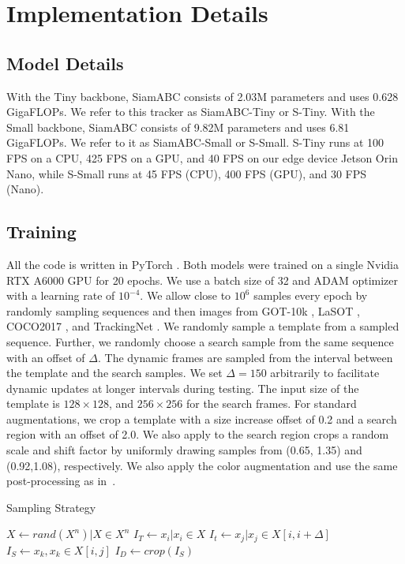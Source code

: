   \label{sec:implementation}
  
  \section{Implementation Details}
  \subsection{Model Details}
  With the Tiny backbone, SiamABC consists of 2.03M parameters and uses 0.628 GigaFLOPs. We refer to this tracker as SiamABC-Tiny or S-Tiny. With the Small backbone, SiamABC consists of 9.82M parameters and uses 6.81 GigaFLOPs. We refer to it as SiamABC-Small or S-Small. S-Tiny runs at 100 FPS on a CPU, 425 FPS on a GPU, and 40 FPS on our edge device Jetson Orin Nano, while S-Small runs at 45 FPS (CPU), 400 FPS (GPU), and 30 FPS (Nano). 
  
  
  \subsection{Training}
  All the code is written in PyTorch \cite{paszke2019pytorch}. Both models were trained on a single Nvidia RTX A6000 GPU for 20 epochs. We use a batch size of 32 and ADAM optimizer \cite{kingma2014adam} with a learning rate of $10^{-4}$. We allow close to $10^6$ samples every epoch by randomly sampling sequences and then images from GOT-10k \cite{Huang2021}, LaSOT \cite{fan2021lasot}, COCO2017 \cite{lin2014microsoft}, and TrackingNet \cite{muller2018trackingnet}. We randomly sample a template from a sampled sequence. Further, we randomly choose a search sample from the same sequence with an offset of $\Delta$. The dynamic frames are sampled from the interval between the template and the search samples. We set $\Delta=150$ arbitrarily to facilitate dynamic updates at longer intervals during testing. The input size of the template is $128\times128$, and $256\times256$ for the search frames. For standard augmentations, we crop a template with a size increase offset of 0.2 and a search region with an offset of 2.0. We also apply to the search region crops a random scale and shift factor by uniformly drawing samples from (0.65, 1.35) and (0.92,1.08), respectively. We also apply the color augmentation and use the same post-processing as in~\cite{bertinetto2016fully}.
  
  \begin{algorithm}
	\centering
	\caption{Sampling Strategy}\label{alg:sampling}
	\begin{algorithmic}
	\State $X \gets rand(X^n) | X \in X^n$ 
	\State $I_T \gets x_i |  x_i \in X$ 
	\State $I_t \gets x_j | x_j \in X[i, i+\Delta]$  
	\State $I_S \gets x_k, x_k \in X[i, j]$ 
	\State $I_D \gets crop(I_S)$ 
	\end{algorithmic}
  \end{algorithm}
  
